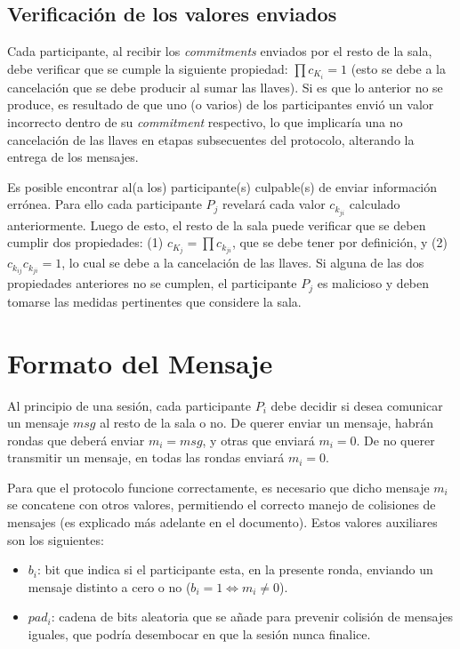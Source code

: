 \subsection{Verificación de los valores enviados}

Cada participante, al recibir los \emph{commitments} enviados por el resto de la 
sala, debe verificar que se cumple la siguiente propiedad: $\prod c_{K_i} = 1$ 
(esto se debe a la cancelación que se debe producir al sumar las llaves). Si es que 
lo anterior no se produce, es resultado de que uno (o varios) de los participantes envió un 
valor incorrecto dentro de su \emph{commitment} respectivo, lo que implicaría una 
no cancelación de las llaves en etapas subsecuentes del protocolo, alterando la entrega 
de los mensajes.

Es posible encontrar al(a los) participante(s) culpable(s) de enviar información errónea. 
Para ello cada participante $P_j$ revelará cada valor $c_{k_{ji}}$ calculado anteriormente. 
Luego de esto, el resto de la sala puede verificar que se deben cumplir dos propiedades: 
(1) $c_{K_j} = \prod c_{k_{ji}}$, que se debe tener por definición, y 
(2) $c_{k_{ij}} c_{k_{ji}} = 1$, lo cual se debe a la cancelación de las llaves. Si alguna 
de las dos propiedades anteriores no se cumplen, el participante $P_j$ es malicioso y deben 
tomarse las medidas pertinentes que considere la sala.

\section{Formato del Mensaje}

Al principio de una sesión, cada participante $P_i$ debe decidir si desea comunicar 
un mensaje $msg$ al resto de la sala o no. De querer enviar un mensaje, habrán 
rondas que deberá enviar $m_i = msg$, y otras que enviará $m_i = 0$. De no querer 
transmitir un mensaje, en todas las rondas enviará $m_i = 0$. 

Para que el protocolo funcione correctamente, es necesario que dicho mensaje $m_i$ 
se concatene con otros valores, permitiendo el correcto manejo de colisiones de 
mensajes (es explicado más adelante en el documento). Estos valores auxiliares son 
los siguientes:
\begin{itemize}
    \item $b_i$: bit que indica si el participante esta, en la presente ronda, 
    enviando un mensaje distinto a cero o no ($b_i = 1 \iff m_i \neq 0$).
    \item $pad_i$: cadena de bits aleatoria que se añade para prevenir colisión 
    de mensajes iguales, que podría desembocar en que la sesión nunca finalice.
\end{itemize}

